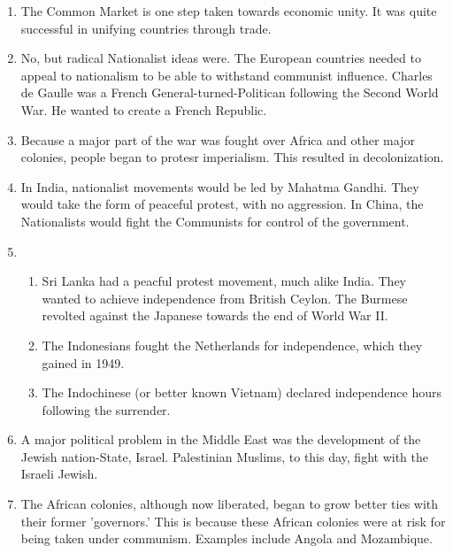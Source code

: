\documentclass[12pt]{article}
\begin{document}
\begin{flushleft}
\begin{enumerate}
    \item The Common Market is one step taken towards economic unity. It was quite successful in unifying countries through trade.

    \item No, but radical Nationalist ideas were. The European countries needed to appeal to nationalism to be able to withstand communist influence. Charles de Gaulle was a French General-turned-Politican following the Second World War. He wanted to create a French Republic.

    \item Because a major part of the war was fought over Africa and other major colonies, people began to protesr imperialism. This resulted in decolonization.

    \item In India, nationalist movements would be led by Mahatma Gandhi. They would take the form of peaceful protest, with no aggression. In China, the Nationalists would fight the Communists for control of the government.

    \item \begin{enumerate}[label=\alph*.]

    \item Sri Lanka had a peacful protest movement, much alike India. They wanted to achieve independence from British Ceylon. The Burmese revolted against the Japanese towards the end of World War II.

    \item The Indonesians fought the Netherlands for independence, which they gained in 1949.

    \item The Indochinese (or better known Vietnam) declared independence hours following the surrender.

    \end{enumerate}

    \item A major political problem in the Middle East was the development of the Jewish nation-State, Israel. Palestinian Muslims, to this day, fight with the Israeli Jewish.

    \item The African colonies, although now liberated, began to grow better ties with their former 'governors.' This is because these African colonies were at risk for being taken under communism. Examples include Angola and Mozambique.


\end{enumerate}
\end{flushleft}
\end{document}
